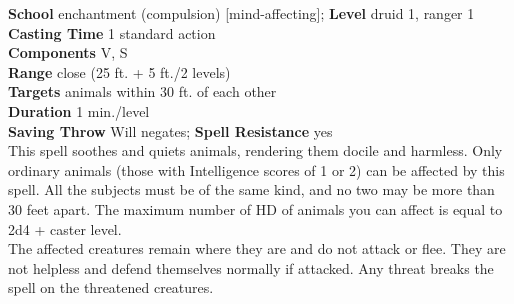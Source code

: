 \textbf{School} enchantment (compulsion) [mind-affecting]; \textbf{Level} druid 1, ranger 1\\
\textbf{Casting Time} 1 standard action\\
\textbf{Components} V, S\\
\textbf{Range} close (25 ft. + 5 ft./2 levels)\\
\textbf{Targets} animals within 30 ft. of each other\\
\textbf{Duration} 1 min./level\\
\textbf{Saving Throw }Will negates; \textbf{Spell Resistance} yes\\
This spell soothes and quiets animals, rendering them docile and harmless. Only ordinary animals (those with Intelligence scores of 1 or 2) can be affected by this spell. All the subjects must be of the same kind, and no two may be more than 30 feet apart. The maximum number of HD of animals you can affect is equal to 2d4 + caster level. \\
The affected creatures remain where they are and do not attack or flee. They are not helpless and defend themselves normally if attacked. Any threat breaks the spell on the threatened creatures.\\
